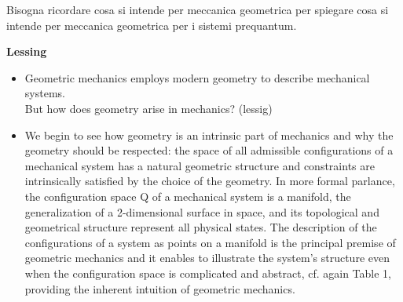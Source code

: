 \documentclass[Main]{subfiles}
\begin{document}
	\begin{Warning}
	Bisogna ricordare cosa si intende per meccanica geometrica per spiegare cosa si intende per meccanica geometrica per i sistemi prequantum.
	
	 \textbf{Lessing}
		
		\begin{itemize}
		\item Geometric mechanics employs modern geometry to describe mechanical systems.\\
		But how does geometry arise in mechanics?  (lessig)
		\item We begin to see how geometry is an intrinsic part of mechanics and why the geometry should be respected: the space of all admissible configurations of a mechanical system has a natural geometric structure and constraints are intrinsically satisfied by the choice of the geometry. In more formal parlance, the configuration space Q of a mechanical system is a manifold, the generalization of
a 2-dimensional surface in space, and its topological and geometrical structure represent all physical states.
	The description of the configurations of a system as points on a manifold is the principal premise of geometric mechanics and it enables to illustrate the system’s structure even when the configuration space is complicated and abstract, cf. again Table 1, providing the inherent intuition of geometric mechanics.

	\end{itemize}
	

\end{Warning}
\end{document}
